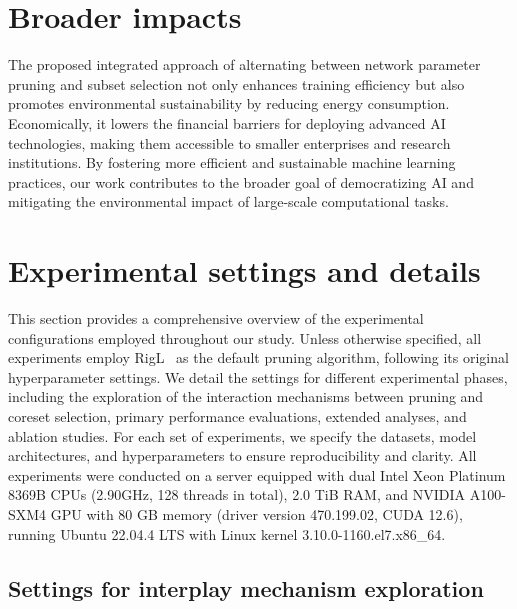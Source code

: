 \section{Broader impacts}
\label{appendix:impacts}
The proposed integrated approach of alternating between network parameter pruning and subset selection not only enhances training efficiency but also promotes environmental sustainability by reducing energy consumption. Economically, it lowers the financial barriers for deploying advanced AI technologies, making them accessible to smaller enterprises and research institutions. By fostering more efficient and sustainable machine learning practices, our work contributes to the broader goal of democratizing AI and mitigating the environmental impact of large-scale computational tasks.

\section{Experimental settings and details}
\label{appendix:exp_details}
This section provides a comprehensive overview of the experimental configurations employed throughout our study. Unless otherwise specified, all experiments employ RigL~\cite{evci2020rigging} as the default pruning algorithm, following its original hyperparameter settings. We detail the settings for different experimental phases, including the exploration of the interaction mechanisms between pruning and coreset selection, primary performance evaluations, extended analyses, and ablation studies. For each set of experiments, we specify the datasets, model architectures, and hyperparameters to ensure reproducibility and clarity. All experiments were conducted on a server equipped with dual Intel Xeon Platinum 8369B CPUs (2.90GHz, 128 threads in total), 2.0 TiB RAM, and NVIDIA A100-SXM4 GPU with 80 GB memory (driver version 470.199.02, CUDA 12.6), running Ubuntu 22.04.4 LTS with Linux kernel 3.10.0-1160.el7.x86\_64.

\subsection{Settings for interplay mechanism exploration}
